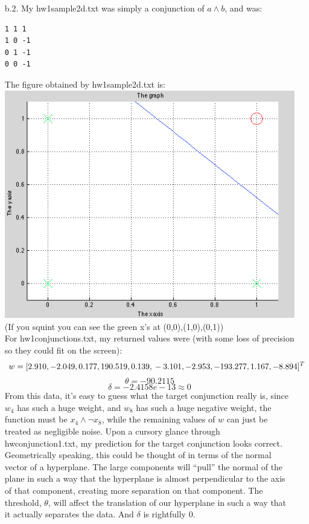 \begin{enumerate}
\begin{enumerate}
        \item[b.2.]
                My hw1sample2d.txt was simply a conjunction of $a \land b$, and was:
\begin{verbatim}
1 1 1
1 0 -1
0 1 -1
0 0 -1
\end{verbatim}
                The figure obtained by hw1sample2d.txt is:\\
                \includegraphics[scale=0.5]{learnConjunctions}\\
                (If you squint you can see the green x's at (0,0),(1,0),(0,1))\\
                For hw1conjunctions.txt, my returned values were (with some loss of precision so they could fit on the screen):
                    $$w = [2.910,
                          -2.049,
                           0.177,
                           190.519,
                           0.139,\\
                          -3.101,
                          -2.953,
                          -193.277,
                           1.167,
                          -8.894]^T$$
                    $$\theta = -90.2115$$
                    $$\delta = -2.4158e-13 \approx 0$$
               From this data, it's easy to guess what the target conjunction really is, since $w_4$ has such a huge weight, and $w_8$ has such a huge negative weight, the function must be $x_4 \land \neg x_8$, while the remaining values of $w$ can just be treated as negligible noise. Upon a cursory glance through hwconjunction1.txt, my prediction for the target conjunction looks correct. Geometrically speaking, this could be thought of in terms of the normal vector of a hyperplane. The large components will ``pull'' the normal of the plane in such a way that the hyperplane is almost perpendicular to the axis of that component, creating more separation on that component. The threshold, $\theta$, will affect the translation of our hyperplane in such a way that it actually separates the data. And $\delta$ is rightfully $0$.

\end{enumerate}
\end{enumerate}
